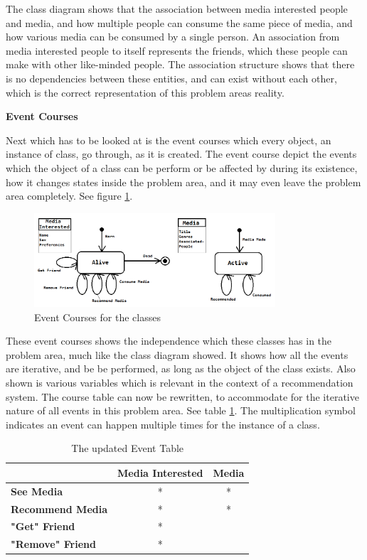 The class diagram shows that the association between media interested people and media, and how multiple people can consume the same piece of media, and how various media can be consumed by a single person. An association from media interested people to itself represents the friends, which these people can make with other like-minded people. The association structure shows that there is no dependencies between these entities, and can exist without each other, which is the correct representation of this problem areas reality.

\textbf{Event Courses}

Next which has to be looked at is the event courses which every object, an instance of class, go through, as it is created. The event course depict the events which the object of a class can be perform or be affected by during its existence, how it changes states inside the problem area, and it may even leave the problem area completely. See figure \ref{Courses}.

\begin{figure}[htb]
\centering
\includegraphics[width=0.8\textwidth]{Images/courses.png}
\caption{Event Courses for the classes}
\label{Courses}
\end{figure}

These event courses shows the independence which these classes has in the problem area, much like the class diagram showed. It shows how all the events are iterative, and be be performed, as long as the object of the class exists. Also shown is various variables which is relevant in the context of a recommendation system. The course table can now be rewritten, to accommodate for the iterative nature of all events in this problem area. See table \ref{UpdatedEventTable}. The multiplication symbol indicates an event can happen multiple times for the instance of a class.

\begin{table}[htb]
\centering
\begin{tabular}{|l|c|c|} \hline
	  & \textbf{Media Interested} & \textbf{Media} \\ \hline
	\textbf{See Media} & * & * \\ \hline
	\textbf{Recommend Media} & * & * \\ \hline
	\textbf{"Get" Friend} & * &  \\ \hline
	\textbf{"Remove" Friend} & * &  \\ \hline
\end{tabular}
\caption{The updated Event Table}
\label{UpdatedEventTable}
\end{table}